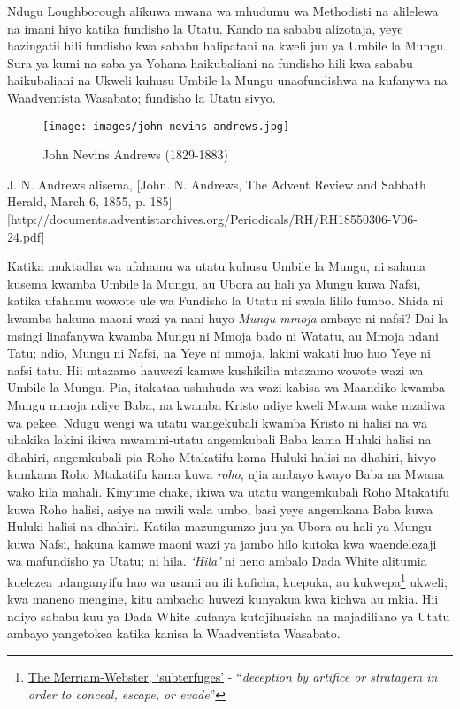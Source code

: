Ndugu Loughborough alikuwa mwana wa mhudumu wa Methodisti na alilelewa na imani hiyo katika fundisho la Utatu. Kando na sababu alizotaja, yeye hazingatii hili fundisho kwa sababu halipatani na kweli juu ya Umbile la Mungu. Sura ya kumi na saba ya Yohana haikubaliani na fundisho hili kwa sababu haikubaliani na Ukweli kuhusu Umbile la Mungu unaofundishwa na kufanywa na Waadventista Wasabato; fundisho la Utatu sivyo.

\begin{figure}[hp]
    \centering
    \texttt{[image: images/john-nevins-andrews.jpg]}
    \caption*{John Nevins Andrews (1829-1883)}
    \label{fig:j-n-andrews}
\end{figure}

J. N. Andrews alisema, [John. N. Andrews, The Advent Review and Sabbath Herald, March 6, 1855, p. 185][http://documents.adventistarchives.org/Periodicals/RH/RH18550306-V06-24.pdf]

Katika muktadha wa ufahamu wa utatu kuhusu Umbile la Mungu, ni salama kusema kwamba Umbile la Mungu, au Ubora au hali ya Mungu kuwa Nafsi, katika ufahamu wowote ule wa Fundisho la Utatu ni swala lililo fumbo. Shida ni kwamba hakuna maoni wazi ya nani huyo \textit{Mungu mmoja} ambaye ni nafsi? Dai la msingi linafanywa kwamba Mungu ni Mmoja bado ni Watatu, au Mmoja ndani Tatu; ndio, Mungu ni Nafsi, na Yeye ni mmoja, lakini wakati huo huo Yeye ni nafsi tatu. Hii mtazamo hauwezi kamwe kushikilia mtazamo wowote wazi wa Umbile la Mungu. Pia, itakataa ushuhuda wa wazi kabisa wa Maandiko kwamba Mungu mmoja ndiye Baba, na kwamba Kristo ndiye kweli Mwana wake mzaliwa wa pekee. Ndugu wengi wa utatu wangekubali kwamba Kristo ni halisi na wa uhakika lakini ikiwa mwamini-utatu angemkubali Baba kama Huluki halisi na dhahiri, angemkubali pia Roho Mtakatifu kama Huluki halisi na dhahiri, hivyo kumkana Roho Mtakatifu kama kuwa \textit{roho}, njia ambayo kwayo Baba na Mwana wako kila mahali. Kinyume chake, ikiwa wa utatu wangemkubali Roho Mtakatifu kuwa Roho halisi, asiye na mwili wala umbo, basi yeye angemkana Baba kuwa Huluki halisi na dhahiri. Katika mazungumzo juu ya Ubora au hali ya Mungu kuwa Nafsi, hakuna kamwe maoni wazi ya jambo hilo kutoka kwa waendelezaji wa mafundisho ya Utatu; ni hila. \textit{‘Hila’} ni neno ambalo Dada White alitumia kuelezea udanganyifu huo wa usanii au ili kuficha, kuepuka, au kukwepa\footnote{\href{https://www.merriam-webster.com/dictionary/subterfuges}{The Merriam-Webster, ‘subterfuges’} - “\textit{deception by artifice or stratagem in order to conceal, escape, or evade}”} ukweli; kwa maneno mengine, kitu ambacho huwezi kunyakua kwa kichwa au mkia. Hii ndiyo sababu kuu ya Dada White kufanya kutojihusisha na majadiliano ya Utatu ambayo yangetokea katika kanisa la Waadventista Wasabato.

